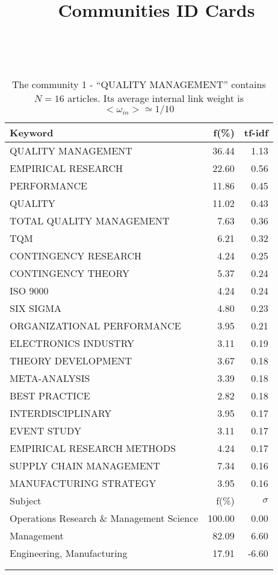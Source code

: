 \documentclass[a4paper,11pt]{report}
\title{{\bf Communities ID Cards}}
\date{\begin{flushleft}This document gather the ``ID Cards'' of the CC communities found within your database.\\
 The CC network was built by keeping a link between articles sharing at least 5 references. The communities characterized here correspond to the ones found in the level 1 (in the sense of the Louvain algo) which gathers more than 0 articles.\\
 These ID cards displays the most frequent keywords, subject categories, journals of publication, institution, countries, authors, references and reference journals of the articles of each community. The significance of an item $\sigma = \sqrt{N} (f - p) / \sqrt{p(1-p)}$ [where $N$ is the number of articles within the community and $f$ and $p$ are the proportion of articles respectively within the community and within the database displaying that item ] is also given (for example $\sigma > 5$ is really highly significant). The tf-idf value which can be calculated by $tf-idf = f*log(frac{1}{p})$ is also given.\\
\vspace{1cm}
\copyright Sebastian Grauwin, Liu Weizhi - (2014) \end{flushleft}}
\begin{document}
\begin{landscape}
\maketitle
\clearpage

\begin{table}[!ht]
\caption{The community 1 - ``QUALITY MANAGEMENT'' contains $N = 16$ articles. Its average internal link weight is $<\omega_{in}> \simeq 1/10$ }
\textcolor{white}{aa}\\
{\scriptsize\begin{tabular}{|l r  r|}
\hline
Keyword & f(\%) & tf-idf \\
\hline
QUALITY MANAGEMENT & 36.44 & 1.13\\
EMPIRICAL RESEARCH & 22.60 & 0.56\\
PERFORMANCE & 11.86 & 0.45\\
QUALITY & 11.02 & 0.43\\
TOTAL QUALITY MANAGEMENT & 7.63 & 0.36\\
TQM & 6.21 & 0.32\\
CONTINGENCY RESEARCH & 4.24 & 0.25\\
CONTINGENCY THEORY & 5.37 & 0.24\\
ISO 9000 & 4.24 & 0.24\\
SIX SIGMA & 4.80 & 0.23\\
ORGANIZATIONAL PERFORMANCE & 3.95 & 0.21\\
ELECTRONICS INDUSTRY & 3.11 & 0.19\\
THEORY DEVELOPMENT & 3.67 & 0.18\\
META-ANALYSIS & 3.39 & 0.18\\
BEST PRACTICE & 2.82 & 0.18\\
INTERDISCIPLINARY & 3.95 & 0.17\\
EVENT STUDY & 3.11 & 0.17\\
EMPIRICAL RESEARCH METHODS & 4.24 & 0.17\\
SUPPLY CHAIN MANAGEMENT & 7.34 & 0.16\\
MANUFACTURING STRATEGY & 3.95 & 0.16\\
\hline
\hline
Subject & f(\%) & $\sigma$\\
\hline
Operations Research \& Management Science & 100.00 & 0.00\\
Management & 82.09 & 6.60\\
Engineering, Manufacturing & 17.91 & -6.60\\
 &  & \\
 &  & \\

\end{tabular}}
\end{table}
\end{landscape}
\end{document}
